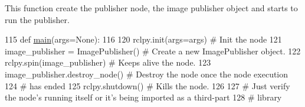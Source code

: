 This function create the publisher node, the image publisher object and starts to run the publisher. 


\begin{DoxyCode}
115 \textcolor{keyword}{def }\mbox{\hyperlink{namespacetoxic__vision_1_1webcam__pub_a0d57aeae4d44f1dcb33eed5082cf3c87}{main}}(args=None):
116     
120     rclpy.init(args=args) \textcolor{comment}{# Init the node}
121     image\_publisher = ImagePublisher() \textcolor{comment}{# Create a new ImagePublisher object.}
122     rclpy.spin(image\_publisher) \textcolor{comment}{# Keeps alive the node.}
123     image\_publisher.destroy\_node() \textcolor{comment}{# Destroy the node once the node execution }
124     \textcolor{comment}{# has ended}
125     rclpy.shutdown() \textcolor{comment}{# Kills the node.}
126   
127   \textcolor{comment}{# Just verify the node's running itself or it's being imported as a third-part}
128   \textcolor{comment}{# library}
\end{DoxyCode}
